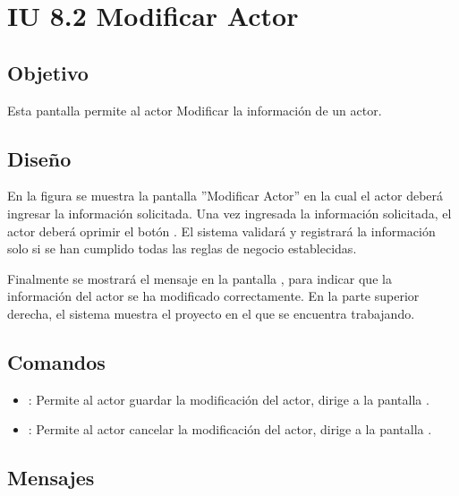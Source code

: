\section{IU 8.2 Modificar Actor}

\subsection{Objetivo}
	Esta pantalla permite al actor Modificar la información de un actor.
\subsection{Diseño}
	En la figura  se muestra la pantalla ''Modificar Actor'' en la cual el actor deberá ingresar la información solicitada.
	Una vez ingresada la información solicitada, el actor deberá oprimir el botón  . El sistema validará y registrará la información solo si se han cumplido todas las reglas de negocio establecidas.
	
	Finalmente se mostrará el mensaje  en la pantalla , para indicar que la información del actor se ha modificado correctamente.
	En la parte superior derecha, el sistema muestra el proyecto en el que se encuentra trabajando.

\subsection{Comandos}
\begin{itemize}
	\item {}: Permite al actor guardar la modificación del actor, dirige a la pantalla .
	\item {}: Permite al actor cancelar la modificación del actor, dirige a la pantalla .
\end{itemize}

\subsection{Mensajes}

